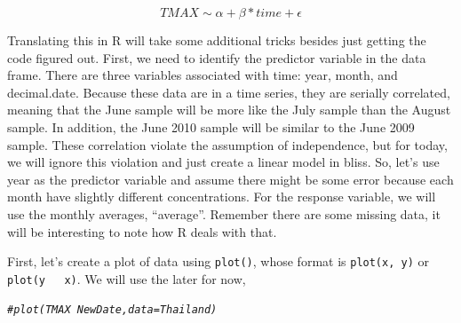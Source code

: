 \documentclass{article}\usepackage[]{graphicx}\usepackage[]{color}
\makeatletter
\newcommand{\hlcom}[1]{\textcolor[rgb]{0.678,0.584,0.686}{\textit{#1}}}%
\newenvironment{kframe}{%
 \def\at@end@of@kframe{}%
 \ifinner\ifhmode%
  \def\at@end@of@kframe{\end{minipage}}%
  \begin{minipage}{\columnwidth}%
 \fi\fi%
 \def\FrameCommand##1{\hskip\@totalleftmargin \hskip-\fboxsep
 \colorbox{shadecolor}{##1}\hskip-\fboxsep
     \hskip-\linewidth \hskip-\@totalleftmargin \hskip\columnwidth}%
 \MakeFramed {\advance\hsize-\width
   \@totalleftmargin\z@ \linewidth\hsize
   \@setminipage}}%
 {\par\unskip\endMakeFramed%
 \at@end@of@kframe}
\newenvironment{knitrout}{}{} %
\makeatother
\begin{document}
\begin{equation}
TMAX \sim \alpha + \beta * time + \epsilon
\end{equation}

Translating this in R will take some additional tricks besides just getting the code figured out. First, we need to identify the predictor variable in the data frame. There are three variables associated with time: year, month, and decimal.date. Because these data are in a time series, they are serially correlated, meaning that the June sample will be more like the July sample than the August sample. In addition, the June 2010 sample will be similar to the June 2009 sample. These correlation violate the assumption of independence, but for today, we will ignore this violation and just create a linear model in bliss. So, let's use year as the predictor variable and assume there might be some error because each month have slightly different concentrations. For the response variable, we will use the monthly averages, "`average"'. Remember there are some missing data, it will be interesting to note how R deals with that.

First, let's create a plot of data using \texttt{plot()}, whose format is \texttt{plot(x, y)} or \texttt{plot(y ~ x)}. We will use the later for now, 

\begin{knitrout}
\color{fgcolor}\begin{kframe}
\begin{alltt}
\hlcom{#plot(TMAX ~ NewDate, data=Thailand)}
\end{alltt}
\end{kframe}
\end{knitrout}
\end{document}
